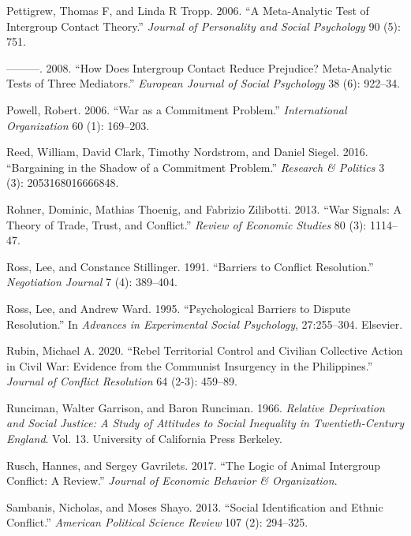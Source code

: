 \documentclass[11pt]{article}
\begin{document}
\leavevmode\hypertarget{ref-pettigrew2006meta}{}%
Pettigrew, Thomas F, and Linda R Tropp. 2006. ``A Meta-Analytic Test of
Intergroup Contact Theory.'' \emph{Journal of Personality and Social
Psychology} 90 (5): 751.

\leavevmode\hypertarget{ref-pettigrew2008does}{}%
---------. 2008. ``How Does Intergroup Contact Reduce Prejudice?
Meta-Analytic Tests of Three Mediators.'' \emph{European Journal of
Social Psychology} 38 (6): 922--34.

\leavevmode\hypertarget{ref-powell2006war}{}%
Powell, Robert. 2006. ``War as a Commitment Problem.''
\emph{International Organization} 60 (1): 169--203.

\leavevmode\hypertarget{ref-reed2016bargaining}{}%
Reed, William, David Clark, Timothy Nordstrom, and Daniel Siegel. 2016.
``Bargaining in the Shadow of a Commitment Problem.'' \emph{Research \&
Politics} 3 (3): 2053168016666848.

\leavevmode\hypertarget{ref-rohner2013war}{}%
Rohner, Dominic, Mathias Thoenig, and Fabrizio Zilibotti. 2013. ``War
Signals: A Theory of Trade, Trust, and Conflict.'' \emph{Review of
Economic Studies} 80 (3): 1114--47.

\leavevmode\hypertarget{ref-ross1991barriers}{}%
Ross, Lee, and Constance Stillinger. 1991. ``Barriers to Conflict
Resolution.'' \emph{Negotiation Journal} 7 (4): 389--404.

\leavevmode\hypertarget{ref-ross1995psychological}{}%
Ross, Lee, and Andrew Ward. 1995. ``Psychological Barriers to Dispute
Resolution.'' In \emph{Advances in Experimental Social Psychology},
27:255--304. Elsevier.

\leavevmode\hypertarget{ref-rubin2020rebel}{}%
Rubin, Michael A. 2020. ``Rebel Territorial Control and Civilian
Collective Action in Civil War: Evidence from the Communist Insurgency
in the Philippines.'' \emph{Journal of Conflict Resolution} 64 (2-3):
459--89.

\leavevmode\hypertarget{ref-runciman1966relative}{}%
Runciman, Walter Garrison, and Baron Runciman. 1966. \emph{Relative
Deprivation and Social Justice: A Study of Attitudes to Social
Inequality in Twentieth-Century England}. Vol. 13. University of
California Press Berkeley.

\leavevmode\hypertarget{ref-rusch2017logic}{}%
Rusch, Hannes, and Sergey Gavrilets. 2017. ``The Logic of Animal
Intergroup Conflict: A Review.'' \emph{Journal of Economic Behavior \&
Organization}.

\leavevmode\hypertarget{ref-sambanis2013social}{}%
Sambanis, Nicholas, and Moses Shayo. 2013. ``Social Identification and
Ethnic Conflict.'' \emph{American Political Science Review} 107 (2):
294--325.
\end{document}
